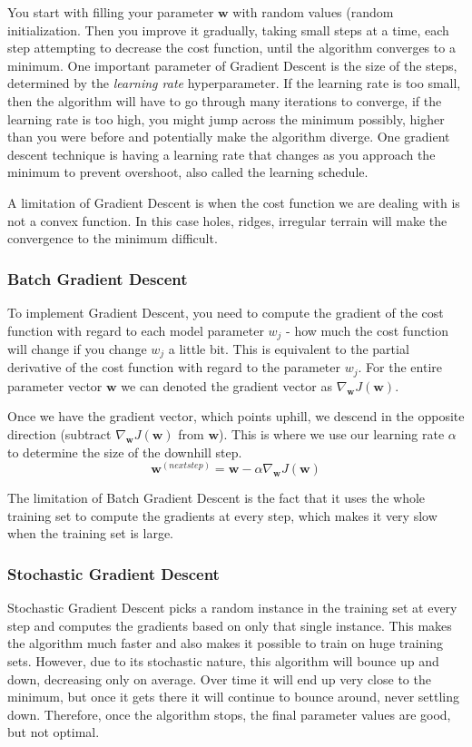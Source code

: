 \documentclass[12pt]{article}
\begin{document}
        You start with filling your parameter $\boldsymbol{w}$ with random values (random initialization. Then you improve it gradually, taking small steps at a time, each step attempting to decrease the cost function, until the algorithm converges
        to a minimum. One important parameter of Gradient Descent is the size of the steps, determined by the \textit{learning rate} hyperparameter. If the learning rate is too small, then the algorithm will have to go through many iterations to converge,
        if the learning rate is too high, you might jump across the minimum possibly, higher than you were before and potentially make the algorithm diverge. One gradient descent technique is having a learning rate that changes as you approach 
        the minimum to prevent overshoot, also called the learning schedule.

        A limitation of Gradient Descent is when the cost function we are dealing with is not a convex function. In this case holes, ridges, irregular terrain will make the convergence to the minimum difficult.

        \subsubsection{Batch Gradient Descent}
            To implement Gradient Descent, you need to compute the gradient of the cost function with regard to each model parameter $w_j$ - how much the cost function will change if you change $w_j$
            a little bit. This is equivalent to the partial derivative of the cost function with regard to the parameter $w_j$. For the entire parameter vector $\boldsymbol{w}$ we can denoted the gradient vector as
            $\nabla_{\boldsymbol{w}} J(\boldsymbol{w})$.

            Once we have the gradient vector, which points uphill, we descend in the opposite direction (subtract $\nabla_{\boldsymbol{w}} J(\boldsymbol{w})$ from $\boldsymbol{w}$). This is where we use our learning rate $\alpha$ to determine the size of the
            downhill step.
            $$ \boldsymbol{w}^{(next step)} = \boldsymbol{w} - \alpha \nabla_{\boldsymbol{w}} J(\boldsymbol{w}) $$

            The limitation of Batch Gradient Descent is the fact that it uses the whole training set to compute the gradients at every step, which makes it very slow when the training set is large.
        
        \subsubsection{Stochastic Gradient Descent}
            Stochastic Gradient Descent picks a random instance in the training set at every step and computes the gradients based on only that single instance. This makes the algorithm much faster and also makes it possible to train on huge training sets.
            However, due to its stochastic nature, this algorithm will bounce up and down, decreasing only on average. Over time it will end up very close to the minimum, but once it gets there it will continue to bounce around, never settling down.
            Therefore, once the algorithm stops, the final parameter values are good, but not optimal.
\end{document}
